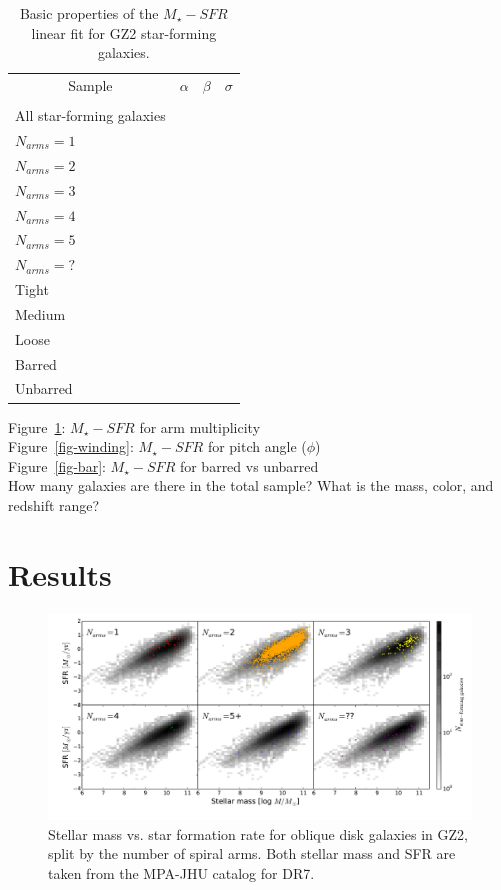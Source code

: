 \documentclass{emulateapj}
\begin{document}
\begin{table}
 \begin{tabular}{@{}lrcl}
 \hline
\multicolumn{1}{c}{Sample} &
\multicolumn{1}{c}{$\alpha$} &
\multicolumn{1}{c}{$\beta$} &
\multicolumn{1}{c}{$\sigma$} 
\\ 
\\ 
\hline
\hline						
All star-forming galaxies  & & & \\
\hline
$N_{arms} = 1$ & & & \\
$N_{arms} = 2$ & & & \\
$N_{arms} = 3$ & & & \\
$N_{arms} = 4$ & & & \\
$N_{arms} = 5$ & & & \\
$N_{arms} = ?$ & & & \\
\hline
Tight & & & \\
Medium & & & \\
Loose & & & \\
\hline
Barred & & & \\
Unbarred & & & \\
\hline
 \end{tabular}
 \caption{Basic properties of the $M_\star-SFR$ linear fit for GZ2 star-forming galaxies. \label{tbl-fits}}
\end{table}

Figure~\ref{fig-number}: $M_\star-SFR$ for arm multiplicity \\
Figure~\ref{fig-winding}: $M_\star-SFR$ for pitch angle ($\phi$) \\
Figure~\ref{fig-bar}: $M_\star-SFR$ for barred vs unbarred \\

How many galaxies are there in the total sample? What is the mass, color, and redshift range?


\section{Results} \label{sec-results}

\begin{figure}
\includegraphics[angle=0,width=7.0in]{figures/ms_arms_number.pdf}
\caption{Stellar mass vs. star formation rate for oblique disk galaxies in GZ2, split by the number of spiral arms. Both stellar mass and SFR are taken from the MPA-JHU catalog for DR7. 
\label{fig-number}}
\end{figure}
\end{document}
